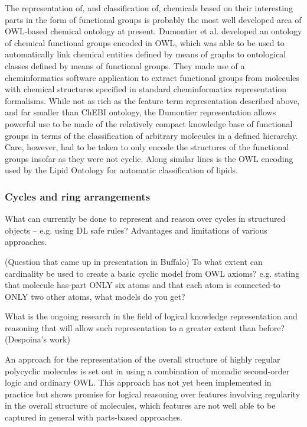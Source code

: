 \documentclass[10pt]{bmc_article}
\newenvironment{bmcformat}{\baselineskip20pt\sloppy\setboolean{publ}{false}}{\baselineskip20pt\sloppy}
\begin{document}
\begin{bmcformat}
The representation of, and classification of, chemicals based on their interesting parts in the form of functional groups is probably the most well developed area of OWL-based chemical ontology at present. Dumontier et al. \cite{dumontier2007} developed an ontology of chemical functional groups encoded in OWL, which was able to be used to automatically link chemical entities defined by means of graphs to ontological classes defined by means of functional groups. They made use of a cheminformatics software application to extract functional groups from molecules with chemical structures specified in standard cheminformatics representation formalisms. While not as rich as the feature term representation described above, and far smaller than ChEBI ontology, the Dumontier representation allows powerful use to be made of the relatively compact knowledge base of functional groups in terms of the classification of arbitrary molecules in a defined hierarchy. Care, however, had to be taken to only encode the structures of the functional groups insofar as they were not cyclic. Along similar lines is the OWL encoding used by the Lipid Ontology \cite{chepelevlipids2011} for automatic classification of lipids. 


\subsubsection*{Cycles and ring arrangements}

What can currently be done to represent and reason over cycles in structured objects -- e.g. using DL safe rules? Advantages and limitations of various approaches. 

(Question that came up in presentation in Buffalo) To what extent can cardinality be used to create a basic cyclic model from OWL axioms?  e.g. stating that molecule has-part ONLY six atoms and that each atom is connected-to ONLY two other atoms, what models do you get? 
 

What is the ongoing research in the field of logical knowledge representation and reasoning that will allow such representation to a greater extent than before?  (Despoina's work)
 
An approach for the representation of the overall structure of highly regular polycyclic molecules is set out in \cite{hastings2011} using a combination of monadic second-order logic and ordinary OWL.  This approach has not yet been implemented in practice but shows promise for logical reasoning over features involving regularity in the overall structure of molecules, which features are not well able to be captured in general with parts-based approaches. 
  


\end{bmcformat}
\end{document}
